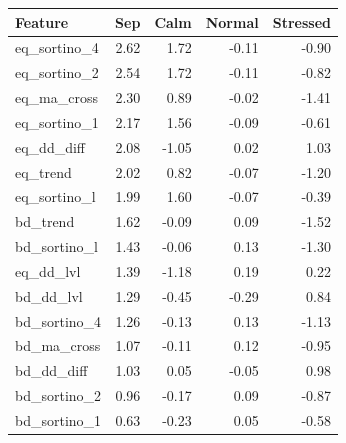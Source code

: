 \begin{tabular}{lrrrr}
\toprule
Feature & Sep & Calm & Normal & Stressed \\
\midrule
eq_sortino_4 & 2.62 & 1.72 & -0.11 & -0.90 \\
eq_sortino_2 & 2.54 & 1.72 & -0.11 & -0.82 \\
eq_ma_cross & 2.30 & 0.89 & -0.02 & -1.41 \\
eq_sortino_1 & 2.17 & 1.56 & -0.09 & -0.61 \\
eq_dd_diff & 2.08 & -1.05 & 0.02 & 1.03 \\
eq_trend & 2.02 & 0.82 & -0.07 & -1.20 \\
eq_sortino_l & 1.99 & 1.60 & -0.07 & -0.39 \\
bd_trend & 1.62 & -0.09 & 0.09 & -1.52 \\
bd_sortino_l & 1.43 & -0.06 & 0.13 & -1.30 \\
eq_dd_lvl & 1.39 & -1.18 & 0.19 & 0.22 \\
bd_dd_lvl & 1.29 & -0.45 & -0.29 & 0.84 \\
bd_sortino_4 & 1.26 & -0.13 & 0.13 & -1.13 \\
bd_ma_cross & 1.07 & -0.11 & 0.12 & -0.95 \\
bd_dd_diff & 1.03 & 0.05 & -0.05 & 0.98 \\
bd_sortino_2 & 0.96 & -0.17 & 0.09 & -0.87 \\
bd_sortino_1 & 0.63 & -0.23 & 0.05 & -0.58 \\
\bottomrule
\end{tabular}
